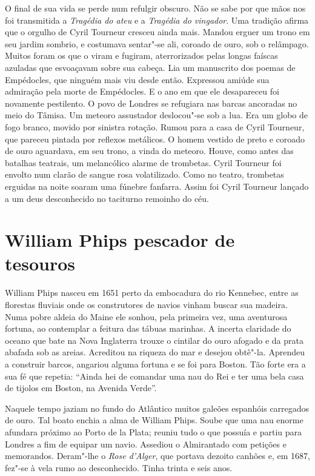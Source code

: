 O final de sua vida se perde num refulgir obscuro. Não se sabe por que mãos
nos foi transmitida a \textit{Tragédia do ateu} e a \textit{Tragédia do
vingador}. Uma tradição afirma que o orgulho de Cyril Tourneur cresceu
ainda mais. Mandou erguer um trono em seu jardim sombrio, e costumava
sentar"-se ali, coroado de ouro, sob o relâmpago. Muitos foram os que o
viram e fugiram, aterrorizados pelas longas faíscas azuladas que
esvoaçavam sobre sua cabeça. Lia um manuscrito dos poemas de Empédocles,
que ninguém mais viu desde então. Expressou amiúde sua admiração pela
morte de Empédocles. E o ano em que ele desapareceu foi novamente
pestilento. O povo de Londres se refugiara nas barcas ancoradas no meio do
Tâmisa. Um meteoro assustador deslocou"-se sob a lua. Era um globo de fogo
branco, movido por sinistra rotação. Rumou para a casa de Cyril Tourneur,
que pareceu pintada por reflexos metálicos. O homem vestido de preto e
coroado de ouro aguardava, em seu trono, a vinda do meteoro. Houve, como
antes das batalhas teatrais, um melancólico alarme de trombetas. Cyril
Tourneur foi envolto num clarão de sangue rosa volatilizado. Como no
teatro, trombetas erguidas na noite soaram uma fúnebre fanfarra. Assim foi
Cyril Tourneur lançado a um deus desconhecido no taciturno remoinho do
céu.

\chapter{William Phips pescador de tesouros}

William Phips nasceu em 1651 perto da embocadura do rio Kennebec, entre as
florestas fluviais onde os construtores de navios vinham buscar sua
madeira. Numa pobre aldeia do Maine ele sonhou, pela primeira vez, uma
aventurosa fortuna, ao contemplar a feitura das tábuas marinhas. A incerta
claridade do oceano que bate na Nova Inglaterra trouxe o cintilar do ouro
afogado e da prata abafada sob as areias. Acreditou na riqueza do mar e
desejou obtê"-la. Aprendeu a construir barcos, angariou alguma fortuna e se
foi para Boston. Tão forte era a sua fé que repetia: “Ainda hei de
comandar uma nau do Rei e ter uma bela casa de tijolos em Boston, na
Avenida Verde”.

Naquele tempo jaziam no fundo do Atlântico muitos galeões espanhóis
carregados de ouro. Tal boato enchia a alma de William Phips. Soube que
uma nau enorme afundara próximo ao Porto de la Plata; reuniu tudo o que
possuía e partiu para Londres a fim de equipar um navio. Assediou o
Almirantado com petições e memorandos. Deram"-lhe o \textit{Rose d’Alger},
que portava dezoito canhões e, em 1687, fez"-se à vela rumo ao
desconhecido. Tinha trinta e seis anos.

